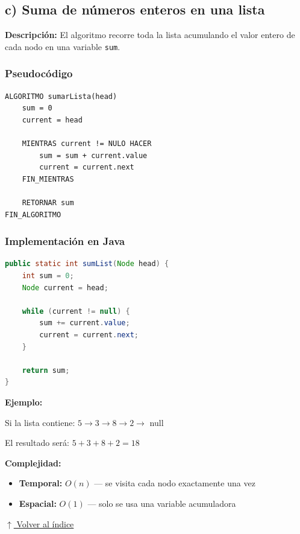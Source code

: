 \documentclass[12pt]{article}
\newcommand{\codigo}[1]{\texttt{\small #1}}
\newcommand{\volverindice}{%
    \vspace{1em}%
    \begin{flushright}%
        \hyperlink{indice}{\small $\uparrow$ Volver al índice}%
    \end{flushright}%
}
\begin{document}
\newpage

\subsection*{c) Suma de números enteros en una lista}

\textbf{Descripción:} El algoritmo recorre toda la lista acumulando el valor entero de cada nodo en una variable \codigo{sum}.

\subsubsection*{Pseudocódigo}

\begin{lstlisting}[style=pseudocodigo]
ALGORITMO sumarLista(head)
    sum = 0
    current = head

    MIENTRAS current != NULO HACER
        sum = sum + current.value
        current = current.next
    FIN_MIENTRAS

    RETORNAR sum
FIN_ALGORITMO
\end{lstlisting}

\subsubsection*{Implementación en Java}

\begin{lstlisting}[style=estilo_base, language=Java]
public static int sumList(Node head) {
    int sum = 0;
    Node current = head;
    
    while (current != null) {
        sum += current.value;
        current = current.next;
    }
    
    return sum;
}
\end{lstlisting}

\textbf{Ejemplo:}

Si la lista contiene: $5 \rightarrow 3 \rightarrow 8 \rightarrow 2 \rightarrow$ null

El resultado será: $5 + 3 + 8 + 2 = 18$

\textbf{Complejidad:}
\begin{itemize}
    \item \textbf{Temporal:} $O(n)$ --- se visita cada nodo exactamente una vez
    \item \textbf{Espacial:} $O(1)$ --- solo se usa una variable acumuladora
\end{itemize}

\volverindice
\newpage
\end{document}
